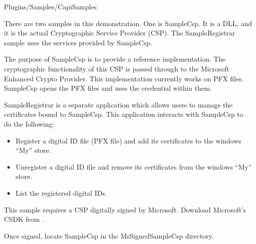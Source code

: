 \documentclass[letterpaper,12pt,english,openany,oneside]{sphinxmanual}
\begin{document}
Plugins/Samples/CapiSamples

\label{\detokenize{Samples_Plug_in:description-2}}

There are two samples in this demonstration. One is SampleCsp. It is a DLL, and it is the actual Cryptographic Service Provider (CSP). The SampleRegistrar sample uses the services provided by SampleCsp.

The purpose of SampleCsp is to provide a reference implementation. The cryptographic functionality of this CSP is passed through to the Microsoft Enhanced Crypto Provider. This implementation currently works on PFX files. SampleCsp opens the PFX files and uses the credential within them.

SampleRegistrar is a separate application which allows users to manage the certificates bound to SampleCsp. This application interacts with SampleCsp to do the following:
\begin{itemize}
\item {} 
Register a digital ID file (PFX file) and add its certificates to the windows “My” store.

\item {} 
Un\sphinxhyphen{}register a digital ID file and remove its certificates from the windows “My” store.

\item {} 
List the registered digital IDs.

\end{itemize}
\label{\detokenize{Samples_Plug_in:usage-1}}

This sample requires a CSP digitally signed by Microsoft. Download Microsoft’s CSDK from .

Once signed, locate SampleCsp in the MsSignedSampleCsp directory.
\end{document}
